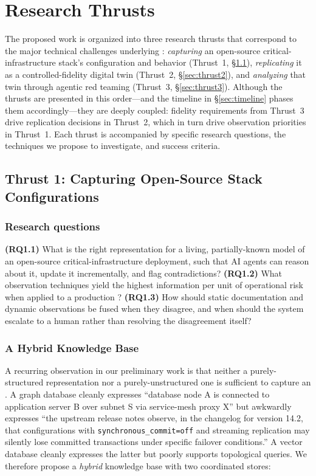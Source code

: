 \section{Research Thrusts}
\label{sec:thrusts}

The proposed work is organized into three research thrusts that
correspond to the major technical challenges underlying \sysname:
\emph{capturing} an open-source critical-infrastructure stack's
configuration and behavior
(Thrust~1, \S\ref{sec:thrust1}), \emph{replicating} it as a
controlled-fidelity digital twin (Thrust~2, \S\ref{sec:thrust2}), and
\emph{analyzing} that twin through agentic red teaming
(Thrust~3, \S\ref{sec:thrust3}). Although the thrusts are presented in
this order---and the timeline in \S\ref{sec:timeline} phases them
accordingly---they are deeply coupled: fidelity requirements from
Thrust~3 drive replication decisions in Thrust~2, which in turn drive
observation priorities in Thrust~1. Each thrust is accompanied by
specific research questions, the techniques we propose to investigate,
and success criteria.

\subsection{Thrust 1: Capturing Open-Source Stack Configurations}
\label{sec:thrust1}

\subsubsection*{Research questions}
\textbf{(RQ1.1)} What is the right representation for a living,
partially-known model of an open-source critical-infrastructure
deployment, such that AI agents can reason about it, update it
incrementally, and flag contradictions?
\textbf{(RQ1.2)} What observation techniques yield the highest
information per unit of operational risk when applied to a production
\cps?
\textbf{(RQ1.3)} How should static documentation and dynamic
observations be fused when they disagree, and when should the system
escalate to a human rather than resolving the disagreement itself?

\subsubsection{A Hybrid Knowledge Base}

A recurring observation in our preliminary work is that neither a
purely-structured representation nor a purely-unstructured one is
sufficient to capture an \cps.  A graph database cleanly expresses
``database node A is connected to application server B over subnet
S via service-mesh proxy X'' but awkwardly expresses ``the upstream
release notes observe, in the changelog for version 14.2, that
configurations with \texttt{synchronous\_commit=off} and streaming
replication may silently lose committed transactions under specific
failover conditions.''  A vector database cleanly expresses the
latter but poorly supports topological queries.  We therefore propose
a \emph{hybrid} knowledge base with two coordinated stores:

